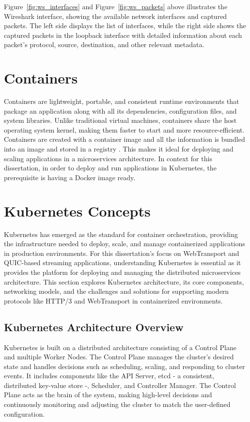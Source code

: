Figure~\ref{fig:ws_interfaces} and Figure~\ref{fig:ws_packets} above illustrates the Wireshark interface, showing the available network interfaces and captured packets. The left side displays the list of interfaces, while the right side shows the captured packets in the loopback interface with detailed information about each packet's protocol, source, destination, and other relevant metadata.

\section{Containers}
Containers are lightweight, portable, and consistent runtime environments that package an application along with all its dependencies, configuration files, and system libraries. Unlike traditional virtual machines, containers share the host operating system kernel, making them faster to start and more resource-efficient. Containers are created with a container image and all the information is bundled into an image and stored in a registry \cite{docker}. This makes it ideal for deploying and scaling applications in a microservices architecture. In context for this dissertation, in order to deploy and run applications in Kubernetes, the prerequisite is having a Docker image ready.

\section{Kubernetes Concepts}

Kubernetes has emerged as the standard for container orchestration, providing the infrastructure needed to deploy, scale, and manage containerized applications in production environments. For this dissertation's focus on WebTransport and QUIC-based streaming applications, understanding Kubernetes is essential as it provides the platform for deploying and managing the distributed microservices architecture. This section explores Kubernetes architecture, its core components, networking models, and the challenges and solutions for supporting modern protocols like HTTP/3 and WebTransport in containerized environments.

\subsection{Kubernetes Architecture Overview}
Kubernetes is built on a distributed architecture consisting of a Control Plane and multiple Worker Nodes. The Control Plane manages the cluster's desired state and handles decisions such as scheduling, scaling, and responding to cluster events. It includes components like the API Server, etcd - a consistent, distributed key-value store -, Scheduler, and Controller Manager. The Control Plane acts as the brain of the system, making high-level decisions and continuously monitoring and adjusting the cluster to match the user-defined configuration.

